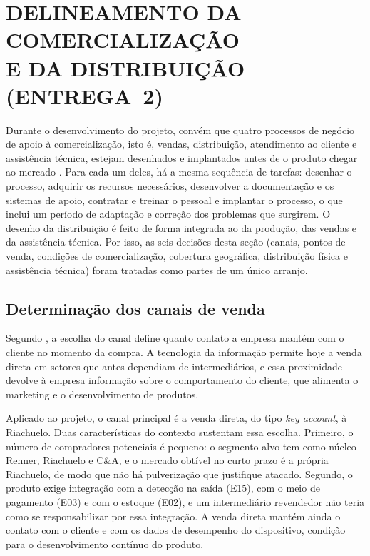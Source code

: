 \section[\texorpdfstring{DELINEAMENTO DA COMERCIALIZAÇÃO E DA DISTRIBUIÇÃO\newline (ENTREGA 2)}{DELINEAMENTO DA COMERCIALIZAÇÃO E DA DISTRIBUIÇÃO (ENTREGA 2)}]{DELINEAMENTO DA COMERCIALIZAÇÃO\\E DA DISTRIBUIÇÃO (ENTREGA~2)}\label{sec:delineamento_comercializacao}




Durante o desenvolvimento do projeto, convém que quatro processos de negócio de apoio à comercialização, isto é, vendas, distribuição, atendimento ao cliente e assistência técnica, estejam desenhados e implantados antes de o produto chegar ao mercado \cite{rozenfeld2006gestao}. Para cada um deles, há a mesma sequência de tarefas: desenhar o processo, adquirir os recursos necessários, desenvolver a documentação e os sistemas de apoio, contratar e treinar o pessoal e implantar o processo, o que inclui um período de adaptação e correção dos problemas que surgirem. O desenho da distribuição é feito de forma integrada ao da produção, das vendas e da assistência técnica. Por isso, as seis decisões desta seção (canais, pontos de venda, condições de comercialização, cobertura geográfica, distribuição física e assistência técnica) foram tratadas como partes de um único arranjo.



\subsection{Determinação dos canais de venda}
\label{subsec:comerc_canais}

Segundo , a escolha do canal define quanto contato a empresa mantém com o cliente no momento da compra. A tecnologia da informação permite hoje a venda direta em setores que antes dependiam de intermediários, e essa proximidade devolve à empresa informação sobre o comportamento do cliente, que alimenta o marketing e o desenvolvimento de produtos. 

Aplicado ao projeto, o canal principal é a venda direta, do tipo \textit{key account}, à Riachuelo. Duas características do contexto sustentam essa escolha. Primeiro, o número de compradores potenciais é pequeno: o segmento-alvo tem como núcleo Renner, Riachuelo e C\&A, e o mercado obtível no curto prazo é a própria Riachuelo, de modo que não há pulverização que justifique atacado. Segundo, o produto exige integração com a detecção na saída (E15), com o meio de pagamento (E03) e com o estoque (E02), e um intermediário revendedor não teria como se responsabilizar por essa integração. A venda direta mantém ainda o contato com o cliente e com os dados de desempenho do dispositivo, condição para o desenvolvimento contínuo do produto.


